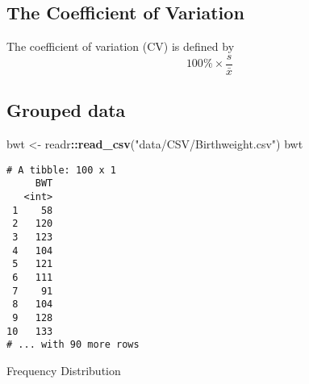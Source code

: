 \documentclass[12pt,]{article}
\newenvironment{Shaded}{\begin{snugshade}}{\end{snugshade}}
\newcommand{\KeywordTok}[1]{\textcolor[rgb]{0.13,0.29,0.53}{\textbf{#1}}}
\newcommand{\DataTypeTok}[1]{\textcolor[rgb]{0.13,0.29,0.53}{#1}}
\newcommand{\StringTok}[1]{\textcolor[rgb]{0.31,0.60,0.02}{#1}}
\newcommand{\CommentTok}[1]{\textcolor[rgb]{0.56,0.35,0.01}{\textit{#1}}}
\newcommand{\OperatorTok}[1]{\textcolor[rgb]{0.81,0.36,0.00}{\textbf{#1}}}
\newcommand{\NormalTok}[1]{#1}
\theoremstyle{definition}
\theoremstyle{definition}
\theoremstyle{definition}
\theoremstyle{remark}
\begin{document}
\subsection{The Coefficient of
Variation}\label{the-coefficient-of-variation}

The coefficient of variation (CV) is defined by
\[100\%\times\frac{s}{\bar{x}}\]

\subsection{Grouped data}\label{grouped-data}

\begin{Shaded}
\begin{Highlighting}[]
\NormalTok{bwt <-}\StringTok{ }\NormalTok{readr}\OperatorTok{::}\KeywordTok{read_csv}\NormalTok{(}\StringTok{"data/CSV/Birthweight.csv"}\NormalTok{)}
\NormalTok{bwt}
\end{Highlighting}
\end{Shaded}

\begin{verbatim}
# A tibble: 100 x 1
     BWT
   <int>
 1    58
 2   120
 3   123
 4   104
 5   121
 6   111
 7    91
 8   104
 9   128
10   133
# ... with 90 more rows
\end{verbatim}

Frequency Distribution

\begin{Shaded}
\end{Shaded}
\end{document}
